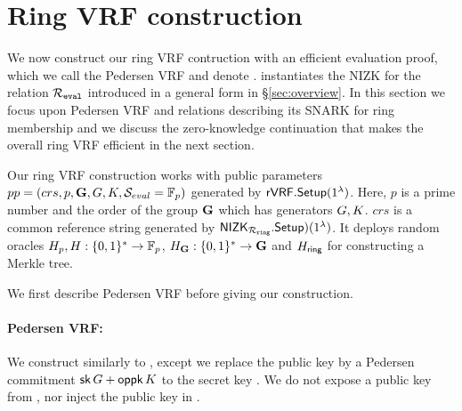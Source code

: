 \section{Ring VRF construction}%
\label{sec:pederson_vrf}

We now construct our ring VRF contruction with an efficient evaluation proof, which
we call the Pedersen VRF and denote \PedVRF.
\PedVRF instantiates the NIZK for the relation $\mathcal{R}_{\mathtt{eval}}$ introduced in a general form in \S\ref{sec:overview}.
In this section we focus upon Pedersen VRF and relations describing its SNARK
for ring membership and we discuss the zero-knowledge continuation
that makes the overall ring VRF efficient in the next section.

Our ring VRF construction works with public parameters $ pp = (crs, p,{\mathbf{G}}, G,K, {\mathcal{S}}_{eval}  = \mathbb{F}_p)  $ generated by $ {\mathsf{rVRF}}.{\mathsf{Setup}}(1^\lambda) $. Here, $ p $ is a prime number and the order of the group $ {\mathbf{G}} $ which has generators $ G,K $. $ crs $ is a common reference string generated by $ {\mathsf{NIZK}}_{\mathcal{R}_{\mathtt{ring}}}.{\mathsf{Setup}})(1^\lambda) $. It deploys random oracles $H_p,H: \{0,1\}^* \to \mathbb{F}_p$, $H_{{\mathbf{G}}}: \{0,1\}^* \to {\mathbf{G}}$ and $ H_{\mathsf{ring}} $ for constructing a Merkle tree.

We first describe Pedersen VRF before giving our construction.
\paragraph{Pedersen VRF:} 
We construct \PedVRF similarly to 
\cite{nsec5,VXEd25519,draft-irtf-cfrg-vrf-10},
except we replace the public key by a Pedersen commitment
$\mathsf{sk} \, G + \mathsf{oppk} \, K$ to the secret key \sk.
We do not expose a public key from \KeyGen, nor inject the public key in \Eval.

